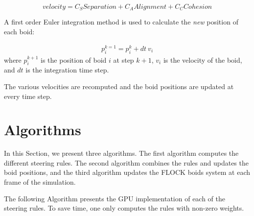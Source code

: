 %

\begin{equation}
\label{combine}
velocity = C_S Separation  + C_A Alignment  + C_C Cohesion 
\end{equation}

A first order Euler integration method is used  to calculate the \textit{new} position of each boid: 

\begin{align}
\label{integrate}
p_i^{k=1} = p_i^k + dt~ v_i
\end{align}
where $p_i^{k+1}$ is the position of boid $i$ at step $k+1$, $v_i$ is the velocity of the boid, and $dt$ is the integration time step. 

The various velocities are recomputed and the boid positions are updated at every time step. 

\section{Algorithms}

In this Section, we present three algorithms. The first algorithm computes the different steering rules. The second algorithm combines the rules and updates the boid positions, and the third algorithm updates the FLOCK boids system at each frame of the simulation. 

The following Algorithm presents the GPU implementation of each of the steering rules. To save time, one only computes the rules with non-zero weights. 

